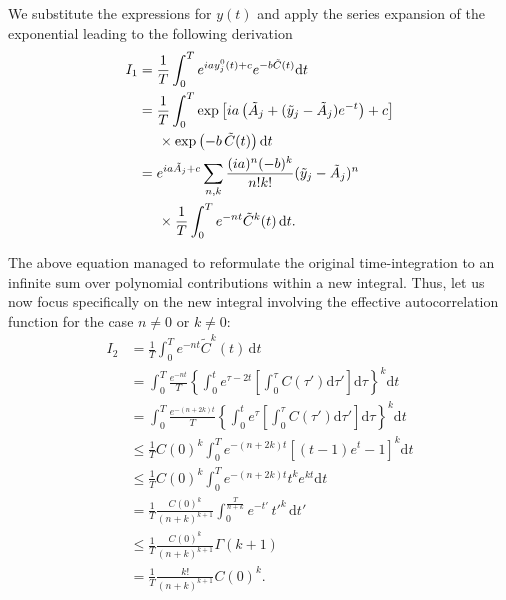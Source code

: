\documentclass[reprint,amsmath,amssymb,aps]{revtex4-2}
\begin{document}
We substitute the expressions for $y(t)$ and apply the series expansion of the exponential  leading to the following derivation
\begin{align}
\label{eq:full_time_integral}
     I_1
    &= 
    \frac{1}{T}
    \int_0^T  
    e^{i a y_j^0(t) + c}
    e^{- b\tilde{C}(t)}
    \mathrm{d}t \nonumber \\
    &=
    \frac{1}{T}
    \int_0^T  
    \exp\left[i a \left(
    \tilde{A}_j
    +(\tilde{y}_j-\tilde{A}_j)e^{-t}
    \right) + c\right]
    \nonumber \\
    &\hspace{0.5cm}\times
    \exp\left(- b\,
    \tilde{C}(t)
    \right)
    \mathrm{d}t
    \nonumber \\
    &=
    e^{ia\tilde{A}_j+c}\sum_{n,k}\frac{(ia)^n (-b)^k}{n! k!}
    (\tilde{y}_j-\tilde{A}_j)^n 
    \nonumber \\
    &\hspace{0.5cm}\times
    \frac{1}{T}
    \int_0^T  
    e^{-nt}
    \tilde{C}^k(t) \,
    \mathrm{d}t.
\end{align}

The above equation managed to reformulate the original time-integration to an infinite sum over polynomial contributions within a new integral.
Thus, let us now focus specifically on the new integral involving the effective autocorrelation function for the case $n \neq 0$ or $k \neq 0$:
\begin{align}
    I_2
    &=
    \frac{1}{T}
    \int_0^T  
    e^{-nt}
    \tilde{C}^k(t) \,
    \mathrm{d}t
    \nonumber
    \\
    &=
    \int_0^T  
    \frac{e^{-nt}}{T}
    \left\{
    \int_0^t e^{\tau - 2 t} 
    \left[ \int_0^\tau C(\tau') \mathrm{d}\tau' \right]
    \mathrm{d}\tau
    \right\}^k
    \mathrm{d}t  \nonumber \\
    &=
    \int_0^T  
    \frac{e^{-(n+2k)t}}{T}
    \left\{
    \int_0^t e^{\tau}
    \left[ \int_0^\tau C(\tau') \mathrm{d}\tau' \right]
    \mathrm{d}\tau
    \right\}^k
    \mathrm{d}t  \nonumber \\
    &\leq
    \label{eq:relation_C}
    \frac{1}{T}
    C(0)^k
    \int_0^T  
    e^{-(n+2k)t}
    \left[
    (t-1)e^t -1
    \right]^k
    \mathrm{d}t  \nonumber \\
    &\leq
    \frac{1}{T}
    C(0)^k
    \int_0^T  
    e^{-(n+2k)t}
    t^k
    e^{kt}
    \mathrm{d}t  \nonumber \\
    &=
    \frac{1}{T}
    \frac{C(0)^k}{(n+k)^{k+1}}
    \int_0^\frac{T}{n+k}  
    e^{-t'}
    \,
    t'^k
    \,
    \mathrm{d}t' \\
    &\leq
    \label{eq:incomplete_gamma_relation}
    \frac{1}{T}
    \frac{C(0)^k}{(n+k)^{k+1}}
    \Gamma\left(k+1\right) \nonumber \\
    &=
    \frac{1}{T}
    \frac{k!}{(n+k)^{k+1}} C(0)^k.
\end{align}
\end{document}
